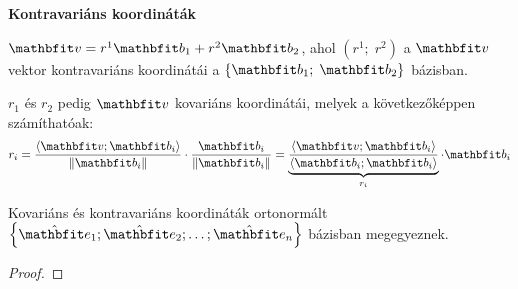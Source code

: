 \begin{note}
\begin{minipage}{.5\textwidth}
\begin{center}


      \textbf{Kontravariáns koordináták}
    \end{center}
  \end{minipage}

  \vspace{2em}

  $\rvec v = r^1 \rvec b_1 + r^2 \rvec b_2$, ahol $(r^1 ; \; r^2)$ a $\rvec v$
  vektor kontravariáns koordinátái a $\left\{ \rvec b_1 ; \; \rvec b_2 \right\}$
  bázisban.

  $r_1$ és $r_2$ pedig $\rvec v$ kovariáns koordinátái, melyek a következőképpen
  számíthatóak:
  $$
    r_i = \frac{\scalar{\rvec v}{\rvec b_i}}{\norma{\rvec b_i}}
    \cdot \frac{\rvec b_i}{\norma{\rvec b_i}}
    = \underbrace{
      \frac{\scalar{\rvec v}{\rvec b_i}}{\scalar{\rvec b_i}{\rvec b_i}}
    }_{r_i}
    \cdot \rvec b_i
  $$
\end{note}

\begin{statement}[][nobreak]
  Kovariáns és kontravariáns koordináták ortonormált
  $\left\{ \uvec e_1; \uvec e_2 ; \dots; \uvec e_n \right\}$
  bázisban megegyeznek.

  \begin{proof}
  \end{proof}
  \vspace*{9em}
\end{statement}